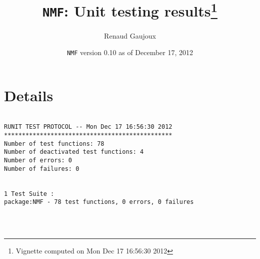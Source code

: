 \documentclass[10pt]{article}
\author{Renaud Gaujoux}
\title{\texttt{NMF}: Unit testing results\footnote{Vignette computed  on Mon Dec 17 16:56:30 2012}}
\date{\texttt{NMF} version 0.10 as of December 17, 2012}
\begin{document}
\maketitle

\section{Details}
\begin{verbatim}

RUNIT TEST PROTOCOL -- Mon Dec 17 16:56:30 2012 
*********************************************** 
Number of test functions: 78 
Number of deactivated test functions: 4 
Number of errors: 0 
Number of failures: 0 

 
1 Test Suite : 
package:NMF - 78 test functions, 0 errors, 0 failures




\end{verbatim}
\end{document}
